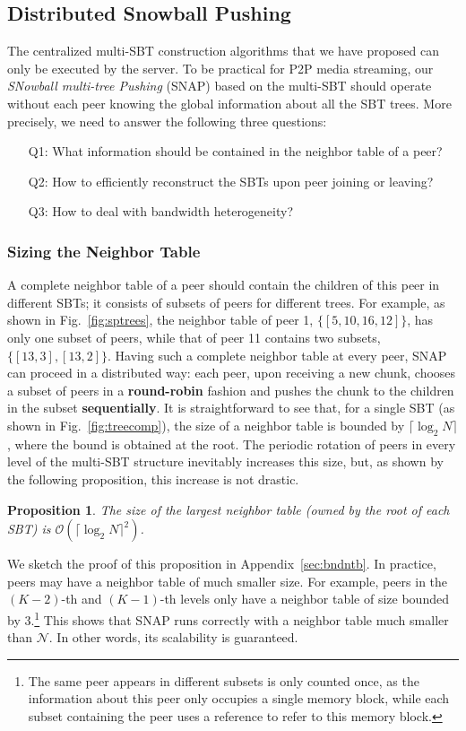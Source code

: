 \documentclass[conference]{IEEEtran}
\newtheorem{prop}{Proposition}
\begin{document}
\subsection{Distributed Snowball Pushing}
The centralized multi-SBT construction algorithms that we have proposed can only be executed by the server. To be practical for P2P media streaming, our \textit{SNowball multi-tree  Pushing} (SNAP) based on the multi-SBT should operate without each peer knowing the global information about all the SBT trees. More precisely, we need to answer the following three questions:
\begin{itemize}
\item [Q1:] What information should be contained in the neighbor table of a peer?
\item [Q2:] How to efficiently reconstruct the SBTs upon peer joining or leaving?
\item [Q3:] How to deal with bandwidth heterogeneity?
  \end{itemize}

\subsubsection{Sizing the Neighbor Table}
  A complete neighbor table of a peer should contain the children of this peer in different SBTs; it consists of subsets of peers for different trees. For example, as shown in Fig.~\ref{fig:sptrees}, the neighbor table of peer 1, $\{[5,10,16,12]\}$, has only one subset of peers, while that of peer 11 contains two subsets, $\{[13,3],[13,2]\}$. Having such a complete neighbor table at every peer, SNAP can proceed in a distributed way: each peer, upon receiving a new chunk, chooses a subset of peers in a \textbf{round-robin} fashion and pushes the chunk to the children in the subset \textbf{sequentially}. It is straightforward to see that, for a single SBT (as shown in Fig.~\ref{fig:treecomp}), the size of a neighbor table is bounded by $\lceil\log_2 N\rceil$, where the bound is obtained at the root. The periodic rotation of peers in every level of the multi-SBT structure inevitably increases this size, but, as shown by the following proposition, this increase is not drastic.
\vspace{1ex}
  \begin{prop} \label{prop:nbsizebd}
    The size of the largest neighbor table (owned by the root of each SBT) is $\mathcal{O}\left(\lceil\log_2 N\rceil^2\right)$.
  \end{prop}
  \vspace{1ex}
We sketch the proof of this proposition in Appendix~\ref{sec:bndntb}. In practice, peers may have a neighbor table of much smaller size. For example, peers in the $(K-2)$-th and $(K-1)$-th levels only have a neighbor table of size bounded by 3.\footnote{The same peer appears in different subsets is only counted once, as the information about this peer only occupies a single memory block, while each subset containing the peer uses a reference to refer to this memory block.} This shows that SNAP runs correctly with a neighbor table much smaller than $\mathcal{N}$. In other words, its scalability is guaranteed.
\end{document}
